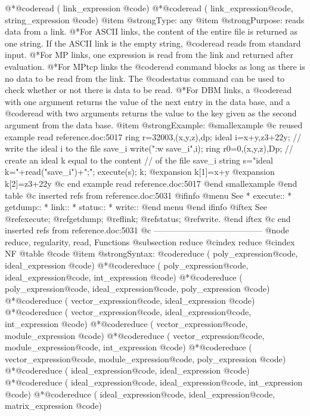 {{{{{{@*@code{read (} link_expression @code{)}
@*@code{read (} link_expression@code{,} string_expression @code{)}
@item @strong{Type:}
any
@item @strong{Purpose:}
reads data from a link.
@*For ASCII links, the content of the entire
file is returned as one string. If the ASCII link is the empty string,
@code{read} reads from standard input.
@*For MP links, one expression is read
from the link and returned after evaluation.
@*For MPtcp links the @code{read} command blocks as long as there is no
data to be read from the link. The @code{status} command can be used to
check whether or not there is data to be read.
@*For DBM links, a @code{read} with one argument returns the value of
the next entry in the data base, and a @code{read} with two arguments
returns the value to the key given as the second argument from the data
base.
@item @strong{Example:}
@smallexample
@c reused example read reference.doc:5017 
  ring r=32003,(x,y,z),dp;
  ideal i=x+y,z3+22y;
  // write the ideal i to the file save_i
  write(":w save_i",i);
  ring r0=0,(x,y,z),Dp;
  // create an ideal k equal to the content
  // of the file save_i
  string s="ideal k="+read("save_i")+";";
  execute(s);
  k;
@expansion{} k[1]=x+y
@expansion{} k[2]=z3+22y
@c end example read reference.doc:5017
@end smallexample
@end table
@c inserted refs from reference.doc:5031
@ifinfo
@menu
See
* execute::
* getdump::
* link::
* status::
* write::
@end menu
@end ifinfo
@iftex
See
@ref{execute};
@ref{getdump};
@ref{link};
@ref{status};
@ref{write}.
@end iftex
@c end inserted refs from reference.doc:5031
@c ---------------------------------------
@node reduce, regularity, read, Functions
@subsection reduce
@cindex reduce
@cindex NF
@table @code
@item @strong{Syntax:}
@code{reduce (} poly_expression@code{,} ideal_expression @code{)}
@*@code{reduce (} poly_expression@code{,} ideal_expression@code{,} int_expression @code{)}
@*@code{reduce (} poly_expression@code{,} ideal_expression@code{,} poly_expression @code{)}
@*@code{reduce (} vector_expression@code{,} ideal_expression @code{)}
@*@code{reduce (} vector_expression@code{,} ideal_expression@code{,} int_expression @code{)}
@*@code{reduce (} vector_expression@code{,} module_expression @code{)}
@*@code{reduce (} vector_expression@code{,} module_expression@code{,} int_expression @code{)}
@*@code{reduce (} vector_expression@code{,} module_expression@code{,} poly_expression @code{)}
@*@code{reduce (} ideal_expression@code{,} ideal_expression @code{)}
@*@code{reduce (} ideal_expression@code{,} ideal_expression@code{,} int_expression @code{)}
@*@code{reduce (} ideal_expression@code{,} ideal_expression@code{,} matrix_expression @code{)}
}}}}}}
